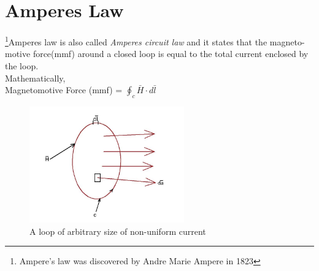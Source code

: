 \section{Amperes Law}
\footnote[9]{Ampere's law was discovered by Andre Marie Ampere in 1823 }Amperes law is also called \emph{Amperes circuit law} and it states that the magneto-motive force(mmf) around a closed loop is equal to the total current enclosed by the loop.\\
Mathematically, \\
Magnetomotive Force (mmf) = $\oint_c \bar{H} \cdot d\bar{l}$ 
\begin{figure}[h]
\centering
\includegraphics[height=5cm]{graphics/j}
\caption{A loop of arbitrary size of non-uniform current}
\label{fig:j}
\end{figure}


